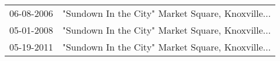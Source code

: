 \begin{supertabular}{ll}
 06-08-2006 &  "Sundown In the City" Market Square, Knoxville... \\
 05-01-2008 &  "Sundown In the City" Market Square, Knoxville... \\
 05-19-2011 &  "Sundown In the City" Market Square, Knoxville... \\
\end{supertabular}
